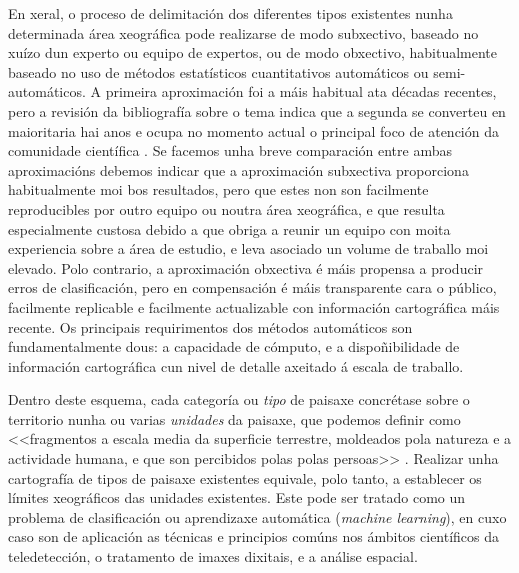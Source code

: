 \documentclass[11pt,a4paper]{article}
\begin{document}
En xeral, o proceso de delimitación dos diferentes tipos existentes nunha determinada área xeográfica pode realizarse de modo subxectivo, baseado no xuízo dun experto ou equipo de expertos, ou de modo obxectivo, habitualmente baseado no uso de métodos estatísticos cuantitativos automáticos ou semi-automáticos. A primeira aproximación foi a máis habitual ata décadas recentes, pero a revisión da bibliografía sobre o tema indica que a segunda se converteu en maioritaria hai anos e ocupa no momento actual o principal foco de atención da comunidade científica \citep{Mucher201087,Jasiewicz2014104}. Se facemos unha breve comparación entre ambas aproximacións debemos indicar que a aproximación subxectiva proporciona habitualmente moi bos resultados, pero que estes non son facilmente reproducibles por outro equipo ou noutra área xeográfica, e que resulta especialmente custosa debido a que obriga a reunir un equipo con moita experiencia sobre a área de estudio, e leva asociado un volume de traballo moi elevado. Polo contrario, a aproximación obxectiva é máis propensa a producir erros de clasificación, pero en compensación é máis transparente cara o público, facilmente replicable e facilmente actualizable con información cartográfica máis recente. Os principais requirimentos dos métodos automáticos son fundamentalmente dous: a capacidade de cómputo, e a dispoñibilidade de información cartográfica cun nivel de detalle axeitado á escala de traballo.





Dentro deste esquema, cada categoría ou \emph{tipo} de paisaxe concrétase sobre o territorio nunha ou varias \emph{unidades} da paisaxe, que podemos definir como <<fragmentos a escala media da superficie terrestre, moldeados pola natureza e a actividade humana, e que son percibidos polas polas persoas>> \citep{Kienast2015136}. Realizar unha cartografía de tipos de paisaxe existentes equivale, polo tanto, a establecer os límites xeográficos das unidades existentes. Este pode ser tratado como un problema de clasificación ou aprendizaxe automática (\emph{machine learning}), en cuxo caso son de aplicación as técnicas e principios comúns nos ámbitos científicos da teledetección, o tratamento de imaxes dixitais, e a análise espacial. 
\end{document}

